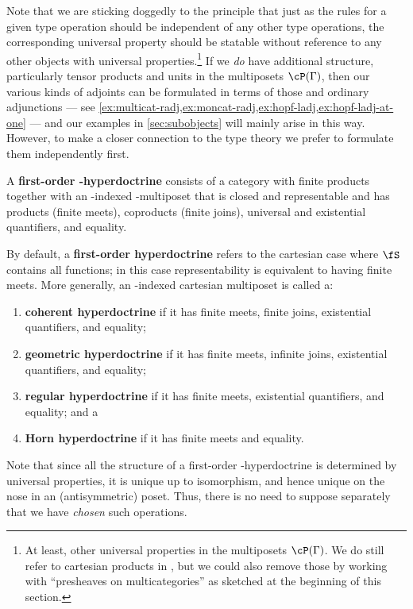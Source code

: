 Note that we are sticking doggedly to the principle that just as the rules for a given type operation should be independent of any other type operations, the corresponding universal property should be statable without reference to any other objects with universal properties.\footnote{At least, other universal properties in the multiposets $\cP(\Gamma)$.
We do still refer to cartesian products in \cS, but we could also remove those by working with ``presheaves on multicategories'' as sketched at the beginning of this section.}
If we \emph{do} have additional structure, particularly tensor products and units in the multiposets $\cP(\Gamma)$, then our various kinds of adjoints can be formulated in terms of those and ordinary adjunctions --- see \cref{ex:multicat-radj,ex:moncat-radj,ex:hopf-ladj,ex:hopf-ladj-at-one} --- and our examples in \cref{sec:subobjects} will mainly arise in this way.
However, to make a closer connection to the type theory we prefer to formulate them independently first.

\begin{defn}
  A \textbf{first-order \fS-hyperdoctrine} consists of a category \cS with finite products together with an \cS-indexed \fS-multiposet that is closed and representable and has products (finite meets), coproducts (finite joins), universal and existential quantifiers, and equality.

  By default, a \textbf{first-order hyperdoctrine} refers to the cartesian case where $\fS$ contains all functions; in this case representability is equivalent to having finite meets.
  More generally, an \cS-indexed cartesian multiposet is called a:
  \begin{enumerate}
  \item \textbf{coherent hyperdoctrine} if it has finite meets, finite joins, existential quantifiers, and equality;
  \item \textbf{geometric hyperdoctrine} if it has finite meets, infinite joins, existential quantifiers, and equality;
  \item \textbf{regular hyperdoctrine} if it has finite meets, existential quantifiers, and equality; and a
  \item \textbf{Horn hyperdoctrine} if it has finite meets and equality.
  \end{enumerate}
\end{defn}

Note that since all the structure of a first-order \fS-hyperdoctrine is determined by universal properties, it is unique up to isomorphism, and hence unique on the nose in an (antisymmetric) poset.
Thus, there is no need to suppose separately that we have \emph{chosen} such operations.

